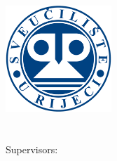 \begin{titlepage}
    \begin{addmargin}[-1cm]{-3cm}
    \begin{center}
        \large  

        \hfill

        \vfill

        \begingroup
            \color{Maroon}\spacedallcaps{\myTitle} \\ \bigskip
        \endgroup

        \spacedlowsmallcaps{\myName}

        \vfill

        \includegraphics[width=4cm]{gfx/other/uni_logo.png} \\\bigskip\bigskip
        \mySubtitle \\ \medskip   
        \myUni \\ \bigskip
        Supervisors: \mySupervisor\\\bigskip
        \myTime

        \vfill                      

    \end{center}  
  \end{addmargin}       
\end{titlepage}   
